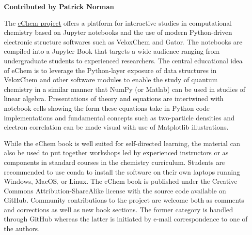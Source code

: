 \textbf{Contributed by Patrick Norman}

The \href{https://doi.org/10.30746/978-91-988114-0-7}{eChem project} offers a platform for interactive studies in computational chemistry based on Jupyter notebooks and the use of modern Python-driven electronic structure softwares such as VeloxChem  and Gator.  
The notebooks are compiled into a Jupyter Book that targets a wide audience ranging from undergraduate students to experienced researchers.
The central educational idea of eChem is to leverage the Python-layer exposure of data structures in VeloxChem and other software modules to enable the study of quantum chemistry in a similar manner that NumPy (or Matlab) can be used in studies of linear algebra. Presentations of theory and equations are intertwined with notebook cells showing the form these equations take in Python code implementations and fundamental concepts such as two-particle densities and electron correlation can be made visual with use of Matplotlib illustrations. 

While the eChem book is well suited for self-directed learning, the material can also be used to put together workshops led by experienced instructors or as components in standard courses in the chemistry curriculum.  Students are recommended to use conda to install the software on their own laptops running Windows, MacOS, or Linux. 
The eChem book is published under the Creative Commons Attribution-ShareAlike license with the source code available on GitHub.  Community contributions to the project are welcome both as comments and corrections as well as new book sections. The former category is handled through GitHub whereas the latter is initiated by e-mail correspondence to one of the authors.